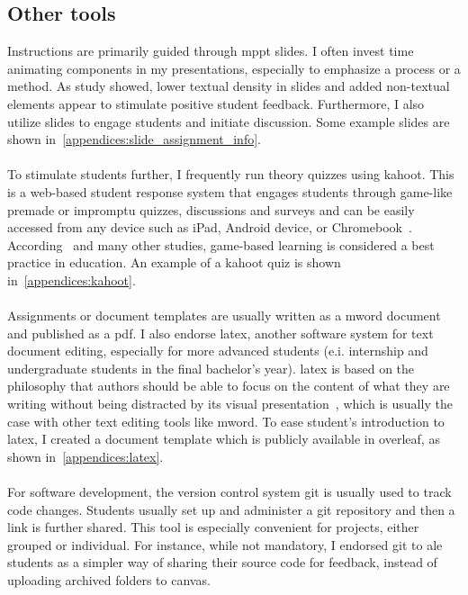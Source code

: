\subsection{Other tools}
Instructions are primarily guided through \Gls{mppt} slides. 
I often invest time animating components in my presentations, especially to emphasize a process or a method. 
As \citet{ppt2011}  study showed, lower textual density in slides and added non-textual elements appear to stimulate positive student feedback. 
Furthermore, I also utilize slides to engage students and initiate discussion. 
Some example slides are shown in~\cref{appendices:slide_assignment_info}.\\\\
To stimulate students further, I frequently run theory quizzes using \Gls{kahoot}. This is a web-based student response system that engages students through game-like premade or impromptu quizzes, discussions and surveys and can be easily accessed from any device such as iPad, Android device, or Chromebook~\cite{kahoot2015}. According~\citet{icard2014} and many other studies, game-based learning is considered a best practice in education. An example of a \Gls{kahoot} quiz is shown in~\cref{appendices:kahoot}.\\\\
Assignments or document templates are usually written as a \Gls{mword} document and published as a \acrshort{pdf}. 
I also endorse \gls{latex}, another software system for text document editing, especially for more advanced students (e.i. internship and undergraduate students in the final bachelor's year). \gls{latex} is based on the philosophy that authors should be able to focus on the content of what they are writing without being distracted by its visual presentation~\cite{latex2014}, which is usually the case with other text editing tools like \Gls{mword}. 
To ease student's introduction to \gls{latex}, I created a document template which is publicly available in \Gls{overleaf}, as shown in~\cref{appendices:latex}.\\\\
For software development, the version control system \Gls{git} is usually used to track code changes. 
Students usually set up and administer a \Gls{git} repository and then a link is further shared. 
This tool is especially convenient for projects, either grouped or individual. For instance, while not mandatory, I endorsed \gls{git} to \acrshort{ale} students as a simpler way of sharing their source code for feedback, instead of uploading archived folders to \gls{canvas}.\\\\
